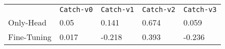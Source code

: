 \begin{tabular}{lllll}
            & \texttt{Catch-v0} & \texttt{Catch-v1} & \texttt{Catch-v2} & \texttt{Catch-v3} \\
Only-Head   & 0.05     & 0.141    & 0.674    & 0.059    \\
Fine-Tuning & 0.017    & -0.218   & 0.393    & -0.236   \\       
\end{tabular}
